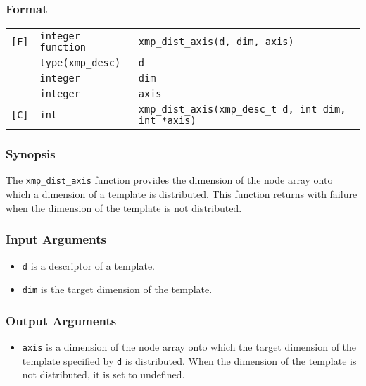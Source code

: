 \subsubsection*{Format}

\begin{tabular}{lll}

\verb![F]!& {\tt integer function}& {\tt xmp\_dist\_axis(d, dim, axis)}\\
          & {\tt type(xmp\_desc)} & {\tt d}\\
          & {\tt integer} & {\tt dim}\\
          & {\tt integer} & {\tt axis}\\

\verb![C]!&  {\tt int}& {\tt xmp\_dist\_axis(xmp\_desc\_t d, int dim, int *axis)}\\

\end{tabular}

\subsubsection*{Synopsis}

The {\tt xmp\_dist\_axis} function provides the dimension of the node
array onto which a dimension of a template is distributed. This function
returns with failure when the dimension of the template is not
distributed.

\subsubsection*{Input Arguments}
\begin{itemize}
 \item {\tt d} is a descriptor of a template.
 \item {\tt dim} is the target dimension of the template.
\end{itemize}

\subsubsection*{Output Arguments}
\begin{itemize}
 \item {\tt axis} is a dimension of the node array onto which 
       the target dimension of the template specified by {\tt d} is
       distributed.  When the dimension of the template is not
       distributed, it is set to undefined.
\end{itemize}


